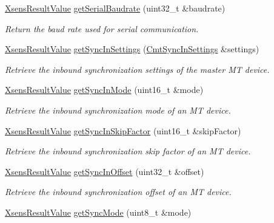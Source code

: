 \begin{DoxyCompactItemize}
\hyperlink{group__enums_ga822a2260a20af524029eef9e9a51ff6f}{\-Xsens\-Result\-Value} \hyperlink{classxsens_1_1Cmt3_a3911357117a756d94b6415a2dfdebd7a}{get\-Serial\-Baudrate} (uint32\-\_\-t \&baudrate)
\begin{DoxyCompactList}\small\item\em \-Return the baud rate used for serial communication. \end{DoxyCompactList}\item 
\hyperlink{group__enums_ga822a2260a20af524029eef9e9a51ff6f}{\-Xsens\-Result\-Value} \hyperlink{classxsens_1_1Cmt3_abf0d84bf2cc7d6a96508e49b870f8a54}{get\-Sync\-In\-Settings} (\hyperlink{structCmtSyncInSettings}{\-Cmt\-Sync\-In\-Settings} \&settings)
\begin{DoxyCompactList}\small\item\em \-Retrieve the inbound synchronization settings of the master \-M\-T device. \end{DoxyCompactList}\item 
\hyperlink{group__enums_ga822a2260a20af524029eef9e9a51ff6f}{\-Xsens\-Result\-Value} \hyperlink{classxsens_1_1Cmt3_aee76676c520e43b2e3002ad80dd89bc2}{get\-Sync\-In\-Mode} (uint16\-\_\-t \&mode)
\begin{DoxyCompactList}\small\item\em \-Retrieve the inbound synchronization mode of an \-M\-T device. \end{DoxyCompactList}\item 
\hyperlink{group__enums_ga822a2260a20af524029eef9e9a51ff6f}{\-Xsens\-Result\-Value} \hyperlink{classxsens_1_1Cmt3_af0d3b45bed5ad62bde7e3abbf6e742df}{get\-Sync\-In\-Skip\-Factor} (uint16\-\_\-t \&skip\-Factor)
\begin{DoxyCompactList}\small\item\em \-Retrieve the inbound synchronization skip factor of an \-M\-T device. \end{DoxyCompactList}\item 
\hyperlink{group__enums_ga822a2260a20af524029eef9e9a51ff6f}{\-Xsens\-Result\-Value} \hyperlink{classxsens_1_1Cmt3_a2d12f040a7839c58564b6b5f7c9b8761}{get\-Sync\-In\-Offset} (uint32\-\_\-t \&offset)
\begin{DoxyCompactList}\small\item\em \-Retrieve the inbound synchronization offset of an \-M\-T device. \end{DoxyCompactList}\item 
\hyperlink{group__enums_ga822a2260a20af524029eef9e9a51ff6f}{\-Xsens\-Result\-Value} \hyperlink{classxsens_1_1Cmt3_a032c21db575256d9c278f26e2fbe66fd}{get\-Sync\-Mode} (uint8\-\_\-t \&mode)

\end{DoxyCompactItemize}
